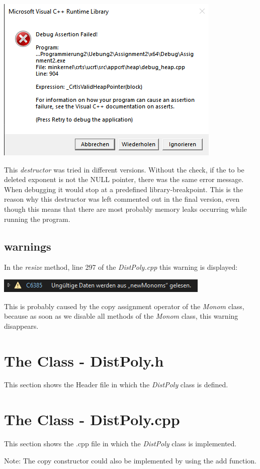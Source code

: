 \documentclass[11pt,titlepage]{article}
\def\StartLineAt#1{\lstset{firstnumber=#1}}
\begin{document}
			\includegraphics[]{Documentation/Error-destructor.png}
		
		This \emph{destructor} was tried in different versions. Without the check, if the to be deleted exponent is not the NULL pointer, there was the same error message. When debugging it would stop at a predefined library-breakpoint.
		This is the reason why this destructor was left commented out in the final version, even though this means that there are most probably memory leaks occurring while running the program.
		\StartLineAt{375}	
		
		
		\subsection{warnings}
		In the \emph{resize} method, line 297 of the \emph{DistPoly.cpp} this warning is displayed:
		
			\includegraphics[scale=1.5]{Documentation/warning-line297.png}
		
		\StartLineAt{293}	
		
		
		This is probably caused by the copy assignment operator of the \emph{Monom} class, because as soon as we disable all methods of the \emph{Monom} class, this warning disappears.
		
	
\newpage
		
	\section{The Class - DistPoly.h}
	This section shows the Header file in which the \emph{DistPoly} class is defined.
	
		
	
\newpage
	\section{The Class - DistPoly.cpp}
		This section shows the .cpp file in which the \emph{DistPoly} class is implemented.	
		
		
		Note: The copy constructor could also be implemented by using the add function.	
		
			
\end{document}
